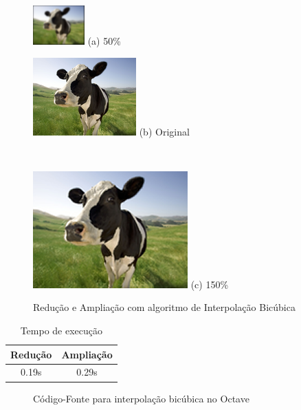 \documentclass[12pt]{article}
\begin{document}
\begin{figure}[H]
    \begin{minipage}{.2\textwidth}
        \centering
        \includegraphics{cow_cubic_smallest}
        (a) 50\%
    \end{minipage}%
    \begin{minipage}{0.35\textwidth}
        \centering
        \includegraphics{cow_very_small}
        (b) Original
    \end{minipage}~
    \begin{minipage}{0.35\textwidth}
        \centering
        \includegraphics{cow_cubic}
        (c) 150\%
    \end{minipage}
    \caption{Redução e Ampliação com algoritmo de Interpolação Bicúbica}
    \label{fig:vaca:bicubic}
\end{figure}

\begin{table}[H]
    \caption{Tempo de execução}
    \centering
    \label{tab:bicubic}
    \begin{tabular}{c||c}
     Redução & Ampliação \\
     \hline
     0.19s & 0.29s
    \end{tabular}
\end{table}

\begin{figure}[H]

\caption{Código-Fonte para interpolação bicúbica no Octave}
\label{lst:scale:cubic}
\end{figure}
\end{document}
